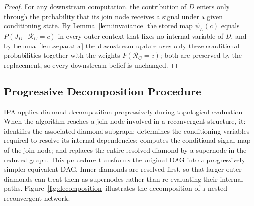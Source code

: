 \documentclass[preprint,12pt]{elsarticle}
\theoremstyle{definition}
\begin{document}
\begin{proof}
For any downstream computation, the contribution of $D$ enters only through the probability that its
join node receives a signal under a given conditioning state. By Lemma~\ref{lem:invariance} the stored
map $\psi_D(c)$ equals $P(J_D\mid \mathcal{R}_C=c)$ in every outer context that fixes no internal
variable of $D$, and by Lemma~\ref{lem:separator} the downstream update uses only these conditional
probabilities together with the weights $P(\mathcal{R}_C=c)$; both are preserved by the replacement, so
every downstream belief is unchanged.
\end{proof}

\subsection{Progressive Decomposition Procedure}\label{sec:procedure}

IPA applies diamond decomposition progressively during topological evaluation. When the algorithm
reaches a join node involved in a reconvergent structure, it: identifies the associated diamond
subgraph; determines the conditioning variables required to resolve its internal dependencies; computes
the conditional signal map of the join node; and replaces the entire resolved diamond by a supernode in
the reduced graph. This procedure transforms the original DAG into a progressively simpler equivalent
DAG. Inner diamonds are resolved first, so that larger outer diamonds can treat them as supernodes
rather than re-evaluating their internal paths. Figure~\ref{fig:decomposition} illustrates the
decomposition of a nested reconvergent network.
\end{document}
